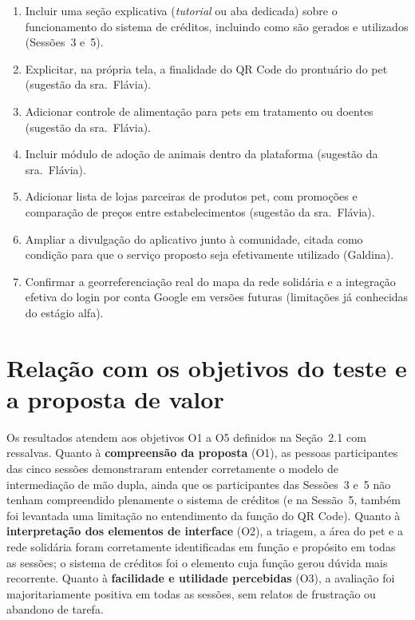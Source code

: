 \documentclass[
    12pt,
    openright,
    oneside,
    a4paper
]{abntex2}
\begin{document}
\begin{enumerate}[label=\textbf{S\arabic*.}, leftmargin=1.6cm]
  \item Incluir uma seção explicativa (\textit{tutorial} ou aba dedicada) sobre o
        funcionamento do sistema de créditos, incluindo como são gerados e utilizados
        (Sessões~3 e~5).
  \item Explicitar, na própria tela, a finalidade do QR Code do prontuário do pet
        (sugestão da sra.~Flávia).
  \item Adicionar controle de alimentação para pets em tratamento ou doentes (sugestão da
        sra.~Flávia).
  \item Incluir módulo de adoção de animais dentro da plataforma (sugestão da
        sra.~Flávia).
  \item Adicionar lista de lojas parceiras de produtos pet, com promoções e comparação de
        preços entre estabelecimentos (sugestão da sra.~Flávia).
  \item Ampliar a divulgação do aplicativo junto à comunidade, citada como condição para que
        o serviço proposto seja efetivamente utilizado (Galdina).
  \item Confirmar a georreferenciação real do mapa da rede solidária e a integração efetiva
        do login por conta Google em versões futuras (limitações já conhecidas do estágio
        alfa).
\end{enumerate}

\section{Relação com os objetivos do teste e a proposta de valor}

Os resultados atendem aos objetivos O1 a O5 definidos na Seção~2.1 com ressalvas. Quanto à
\textbf{compreensão da proposta} (O1), as pessoas participantes das cinco sessões demonstraram
entender corretamente o modelo de intermediação de mão dupla, ainda
que os participantes das Sessões~3 e~5 não tenham compreendido plenamente o sistema de créditos (e na Sessão~5, também foi levantada uma limitação no entendimento da função do QR Code). Quanto à
\textbf{interpretação dos elementos de interface} (O2), a triagem, a área do pet e a rede
solidária foram corretamente identificadas em função e propósito em todas as sessões; o
sistema de créditos foi o elemento cuja função gerou dúvida mais recorrente. Quanto à
\textbf{facilidade e utilidade percebidas} (O3), a avaliação foi majoritariamente positiva em
todas as sessões, sem relatos de frustração ou abandono de tarefa.
\end{document}
